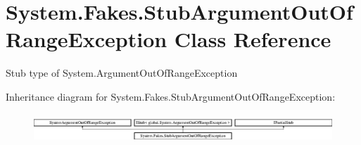 \hypertarget{class_system_1_1_fakes_1_1_stub_argument_out_of_range_exception}{\section{System.\-Fakes.\-Stub\-Argument\-Out\-Of\-Range\-Exception Class Reference}
\label{class_system_1_1_fakes_1_1_stub_argument_out_of_range_exception}
}


Stub type of System.\-Argument\-Out\-Of\-Range\-Exception 


Inheritance diagram for System.\-Fakes.\-Stub\-Argument\-Out\-Of\-Range\-Exception\-:\begin{figure}[H]
\begin{center}
\leavevmode
\includegraphics[height=1.121121cm]{class_system_1_1_fakes_1_1_stub_argument_out_of_range_exception}
\end{center}
\end{figure}
